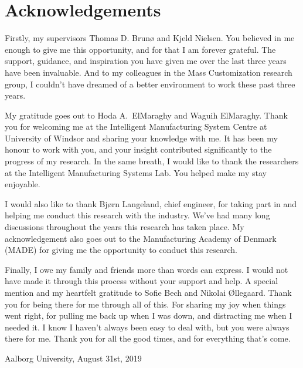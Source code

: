 \section*{Acknowledgements}\label{ack}

Firstly, my supervisors \AProf{} Thomas D. Brunø and \AProf{} Kjeld Nielsen.
You believed in me enough to give me this opportunity, and for that I am forever grateful.
The support, guidance, and inspiration you have given me over the last three years have been invaluable.
And to my colleagues in the Mass Customization research group, I couldn't have dreamed of a better environment to work these past three years. 

My gratitude  goes out to \Prof{} Hoda A.\ ElMaraghy and \Prof{} Waguih ElMaraghy.
Thank you for welcoming me at the Intelligent Manufacturing System Centre at University of Windsor and sharing your knowledge with me.
It has been my honour to work with you, and your insight contributed significantly to the progress of my research.
In the same breath, I would like to thank the researchers at the Intelligent Manufacturing Systems Lab.
You helped make my stay enjoyable.

I would also like to thank Bjørn Langeland, chief engineer, for taking part in and helping me conduct this research with the industry.
We've had many long discussions throughout the years this research has taken place.
My acknowledgement also goes out to the Manufacturing Academy of Denmark (MADE) for giving me the opportunity to conduct this research.

Finally, I owe my family and friends more than words can express.
I would not have made it through this process without your support and help. 
A special mention and my heartfelt gratitude to Sofie Bech and Nikolai Øllegaard.
Thank you for being there for me through all of this.
For sharing my joy when things went right, for pulling me back up when I was down, and distracting me when I needed it.
I know I haven't always been easy to deal with, but you were always there for me.
Thank you for all the good times, and for everything that's come.
\begin{flushright}
\docAuthor%

Aalborg University, August 31st, 2019
\end{flushright}
